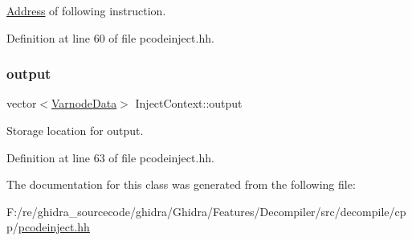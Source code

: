 \mbox{\hyperlink{class_address}{Address}} of following instruction. 



Definition at line 60 of file pcodeinject.\+hh.

\mbox{\label{class_inject_context_a9304de2b8553f6bee836cd2ba7cdc187}} 
\subsubsection{\texorpdfstring{output}{output}}
{\footnotesize\ttfamily vector$<$\mbox{\hyperlink{struct_varnode_data}{Varnode\+Data}}$>$ Inject\+Context\+::output}



Storage location for output. 



Definition at line 63 of file pcodeinject.\+hh.



The documentation for this class was generated from the following file\+:\begin{DoxyCompactItemize}
\item 
F\+:/re/ghidra\+\_\+sourcecode/ghidra/\+Ghidra/\+Features/\+Decompiler/src/decompile/cpp/\mbox{\hyperlink{pcodeinject_8hh}{pcodeinject.\+hh}}\end{DoxyCompactItemize}
